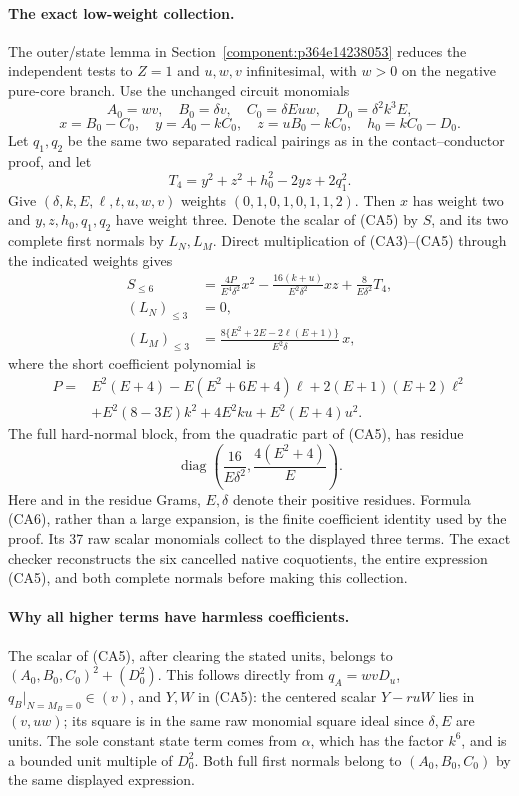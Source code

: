 \paragraph{The exact low-weight collection.}
The outer/state lemma in Section~\ref{component:p364e14238053} reduces the
independent tests to $Z=1$ and $u,w,v$ infinitesimal, with $w>0$ on
the negative pure-core branch. Use the unchanged circuit monomials
\[
 A_0=wv,\quad B_0=\delta v,\quad C_0=\delta Euw,
 \quad D_0=\delta^2k^3E,
\]
\[
 x=B_0-C_0,\quad y=A_0-kC_0,\quad
 z=uB_0-kC_0,\quad h_0=kC_0-D_0.
\]
Let $q_1,q_2$ be the same two separated radical pairings as in the
contact--conductor proof, and let
\[
 T_4=y^2+z^2+h_0^2-2yz+2q_1^2.
\]
Give $(\delta,k,E,\ell,t,u,w,v)$ weights $(0,1,0,1,0,1,1,2)$.
Then $x$ has weight two and $y,z,h_0,q_1,q_2$ have weight three.
Denote the scalar of (CA5) by $S$, and its two complete first normals
by $L_N,L_M$. Direct multiplication of (CA3)--(CA5) through the
indicated weights gives
\[
 \begin{aligned}
 S_{\le6}&=\frac{4P}{E^4\delta^2}x^2
 -\frac{16(k+u)}{E^2\delta^2}xz
 +\frac8{E\delta^2}T_4,\\
 (L_N)_{\le3}&=0,\\
 (L_M)_{\le3}&=
 \frac{8\{E^2+2E-2\ell(E+1)\}}{E^2\delta}\,x,
 \end{aligned}                                                   \tag{CA6}
\]
where the short coefficient polynomial is
\[
 \begin{split}
 P={}&E^2(E+4)-E(E^2+6E+4)\ell+2(E+1)(E+2)\ell^2\\
 &+E^2(8-3E)k^2+4E^2ku+E^2(E+4)u^2.
 \end{split}
\]
The full hard-normal block, from the quadratic part of (CA5), has
residue
\[
       \operatorname{diag}\left(\frac{16}{E\delta^2},
                                \frac{4(E^2+4)}E\right).          \tag{CA7}
\]
Here and in the residue Grams, $E,\delta$ denote their positive
residues. Formula (CA6), rather than a large expansion, is the finite
coefficient identity used by the proof. Its 37 raw scalar monomials
collect to the displayed three terms. The exact checker reconstructs
the six cancelled native coquotients, the entire expression (CA5),
and both complete normals before making this collection.

\paragraph{Why all higher terms have harmless coefficients.}
The scalar of (CA5), after clearing the stated units, belongs to
$(A_0,B_0,C_0)^2+(D_0^2)$. This follows directly from $q_A=wvD_u$,
$q_B|_{N=M_B=0}\in(v)$, and $Y,W$ in (CA5): the centered scalar
$Y-r uW$ lies in $(v,uw)$; its square is in the same raw monomial
square ideal since $\delta,E$ are units. The sole constant state term
comes from $\alpha$, which has the factor $k^6$, and is a bounded
unit multiple of $D_0^2$. Both full first normals belong to
$(A_0,B_0,C_0)$ by the same displayed expression.

